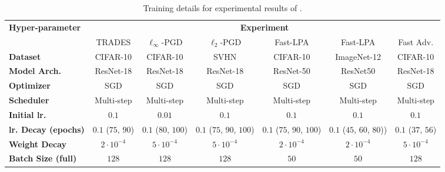 \documentclass[runningheads]{llncs}
\begin{document}
\begin{sidewaystable}[htp]
	\caption{Training details for experimental results of .}
	\label{tab:hyper}
	\begin{center}
		\begin{scriptsize}
			\begin{tabular}{lcccccc}
				\toprule
				\multirow{2}{*}{\textbf{Hyper-parameter}}    & \multicolumn{6}{c}{\textbf{Experiment}}\\
				\cmidrule{2-7}
				& TRADES                                    & $\ell_\infty$-PGD                & $\ell_2$-PGD                    & Fast-LPA                   & Fast-LPA                  & Fast Adv.\\
				\midrule
				\textbf{Dataset}                            & CIFAR-10                         & CIFAR-10                        & SVHN                       & CIFAR-10                  & ImageNet-12 & CIFAR-10\\
				\textbf{Model Arch.}                        & ResNet-18                        & ResNet-18                       & ResNet-18                  & ResNet-50                 & ResNet50    & ResNet-18\\
				\midrule
				\textbf{Optimizer}                          & SGD                              & SGD                             & SGD                        & SGD                       & SGD         & SGD\\
				\textbf{Scheduler}                          & Multi-step                       & Multi-step                      & Multi-step                 & Multi-step                & Multi-step  & Multi-step\\
				\textbf{Initial lr.}                        & $0.1$                            & $0.01$                          & $0.1$                      & $0.1$                     & $0.1$       & $0.1$\\
				\textbf{lr. Decay (epochs)}                 & $0.1$ ($75$, $90$)               & $0.1$ ($80$, $100$)       & $0.1$ ($75$, $90$, $100$)  & $0.1$ ($75$, $90$, $100$) & $0.1$ ($45$, $60$, $80$)) & $0.1$ ($37$, $56$)\\
				\textbf{Weight Decay}                       & $2\cdot10^{-4}$                  & $5\cdot10^{-4}$                 & $5\cdot10^{-4}$            & $2\cdot10^{-4}$           & $2\cdot10^{-4}$ & $5\cdot10^{-4}$\\
				\textbf{Batch Size (full)}                  & $128$                            & $128$                           & $128$                      & $50$                      & $50$      & $128$\\

\end{tabular}
\end{scriptsize}
\end{center}
\end{sidewaystable}
\end{document}
